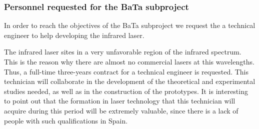 
\subsubsection*{Personnel requested for the BaTa subproject}

In order to reach the objectives of the BaTa subproject we request the a technical engineer to help developing the infrared laser.

The infrared laser sites in a very unfavorable region of the infrared spectrum. This is the reason why there are almost no commercial lasers at this wavelengths.
Thus, a full-time three-years contract for a technical engineer is requested. This technician will collaborate in the development of the theoretical and experimental studies needed, as well as in the construction of the prototypes. It is interesting to point out that the formation in laser technology that this technician will acquire during this period will be extremely valuable, since there is a lack of people with such qualifications in Spain.

